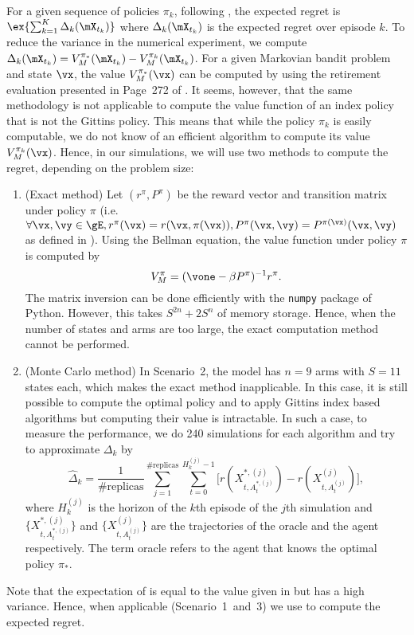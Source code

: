 For a given sequence of policies $\pi_k$, following , the expected regret is $\ex{\sum_{k=1}^K\Delta_k(\mX_{t_k})}$ where $\Delta_k(\mX_{t_k})$ is the expected regret over episode $k$.
To reduce the variance in the numerical experiment, we compute
$\Delta_k(\mX_{t_k})=V^{\pi_*}_M(\mX_{t_k}) -V^{\pi_k}_M(\mX_{t_k})$.
For a given Markovian bandit problem and state $\vx$, the value $V^{\pi_*}_{M}(\vx)$ can be computed by using the retirement evaluation presented in Page~272 of \cite{whittle1996optimal}. It seems, however, that the same methodology is not applicable to compute the value function of an index policy that is not the Gittins policy. This means that while the policy $\pi_k$ is easily computable, we do not know of an efficient algorithm to compute its value $V^{\pi_k}_{M}(\vx)$. Hence, in our simulations, we will use two methods to compute the regret, depending on the problem size:
\begin{enumerate}
    \item (Exact method) Let $(r^{\pi}, P^{\pi})$ be the reward vector and transition matrix under policy $\pi$ (i.e. $\forall \vx, \vy\in\gE, r^{\pi}(\vx)=r(\vx,\pi(\vx)), P^{\pi}(\vx,\vy)=P^{\pi(\vx)}(\vx, \vy)$ as defined in ). Using the Bellman equation, the value function under policy $\pi$ is computed by
    \begin{equation}
        \label{eq:exact_value}
        V_{M}^{\pi}=(\vone-\beta P^{\pi})^{-1}r^{\pi}.
    \end{equation}
    The matrix inversion can be done efficiently with the \texttt{numpy} package of Python. However, this takes $S^{2n}+2S^{n}$ of memory storage. Hence, when the number of states and arms are too large, the exact computation method cannot be performed. 

    \item (Monte Carlo method) In Scenario~2, the model has $n=9$ arms with $S=11$ states each, which makes the exact method inapplicable. In this case, it is still possible to compute the optimal policy and to apply Gittins index based algorithms but computing their value is intractable. In such a case, to measure the performance, we do 240 simulations for each algorithm and try to approximate $\Delta_k$ by
    \begin{equation}
        \label{eq:simulation_value}
        \hat{\Delta}_k=\frac1{\text{\#replicas}}\sum_{j=1}^{\text{\#replicas}}\sum_{t=0}^{H_k^{(j)}-1}\Big[r(X_{t,A^{*,(j)}_t}^{*,(j)}) -r(X_{t,A^{(j)}_t}^{(j)})\Big],
    \end{equation}
    where $H_k^{(j)}$ is the horizon of the $k$th episode of the $j$th simulation and $\{X_{t,A^{*,(j)}_t}^{*,(j)}\}$ and $\{X_{t,A^{(j)}_t}^{(j)}\}$ are the trajectories of the oracle and the agent respectively. The term oracle refers to the agent that knows the optimal policy $\pi_*$.
\end{enumerate}
Note that the expectation of  is equal to the value given in  but  has a high variance. Hence, when applicable (Scenario~1~and~3) we use  to compute the expected regret.

